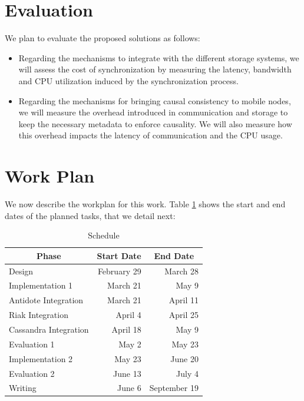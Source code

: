 \section{Evaluation}
\label{sec:work_evaluation}
We plan to evaluate the proposed solutions as follows:
\begin{itemize}
\item Regarding the mechanisms to integrate with the different storage systems, we will assess the cost of synchronization by measuring the latency, bandwidth and CPU utilization induced by the synchronization process.

\item Regarding the mechanisms for bringing causal consistency to mobile nodes, we will measure the overhead introduced in communication and storage to keep the necessary metadata to enforce causality. We will also measure how this overhead impacts the latency of communication and the CPU usage.
\end{itemize}
	
\section{Work Plan}
\label{sec:work_plan}
We now describe the workplan for this work. Table \ref{tbl:schedule} shows the start and end dates of the planned tasks, that we detail next:

\begin{table}[H]
  \centering
  \begin{tabular}{l r r} \toprule
    \multicolumn{1}{c}{\textbf{Phase}} & \multicolumn{1}{c}{\textbf{Start Date}} & \multicolumn{1}{c}{\textbf{End Date}} \\
    \toprule
    Design & February 29 & March 28 \\
    \midrule
    Implementation 1 & March 21 & May 9 \\
    \hspace{1em} Antidote Integration & March 21 & April 11 \\
    \hspace{1em} Riak Integration & April 4 & April 25 \\
    \hspace{1em} Cassandra Integration & April 18 & May 9 \\
    \midrule
    Evaluation 1 & May 2 & May 23 \\
    \midrule
    Implementation 2 & May 23 & June 20 \\
    \midrule
    Evaluation 2 & June 13 & July 4 \\
    \midrule
    Writing & June 6 & September 19 \\ \bottomrule
  \end{tabular}
  \caption{Schedule}
  \label{tbl:schedule}
\end{table}

